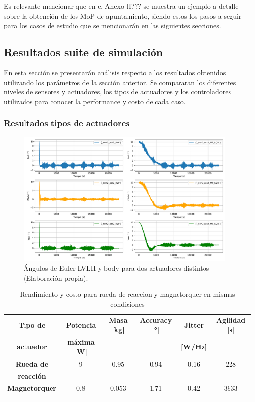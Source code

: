 Es relevante mencionar que en el Anexo H??? se muestra un ejemplo a detalle sobre la obtención de los MoP de apuntamiento, siendo estos los pasos a seguir para los casos de estudio que se mencionarán en las siguientes secciones.

\subsection{Resultados suite de simulación}

En esta sección se presentarán análisis respecto a los resultados obtenidos utilizando los parámetros de la sección anterior. Se compararan los diferentes niveles de sensores y actuadores, los tipos de actuadores y los controladores utilizados para conocer la performance y costo de cada caso.

\subsubsection{Resultados tipos de actuadores}



\begin{figure}[H]
	\centering    
	\includegraphics[width=0.97\textwidth]{MT_RW_nivel2.pdf}
	\caption{Ángulos de Euler LVLH y body para dos actuadores distintos (Elaboración propia).}
	\label{fig:MT_RW_nivel2}
\end{figure}


\begin{table}[h!]
	\centering
	\caption{Rendimiento y costo para rueda de reaccion y magnetorquer en mismas condiciones}
	\begin{tabular}{|c|c|c|c|c|c|}
		\hline
		\textbf{Tipo de}   & \textbf{Potencia} & \textbf{Masa [kg]} & \textbf{Accuracy [°]} & \textbf{Jitter} & \textbf{Agilidad [s]}  \\ 
		\textbf{actuador}   & \textbf{máxima [W]} & & & \textbf{[W/Hz]} &  \\
		\hline
		\textbf{Rueda de}   & 9  & 0.95  & 0.94 & 0.16 & 228   \\
		\textbf{reacción}   &  &   &  &  &    \\
		\hline
		\textbf{Magnetorquer}   & 0.8  & 0.053  & 1.71 & 0.42 & 3933   \\
		& & & & &   \\
		\hline
	\end{tabular}
	\label{tab:RW_MT_nivel2}
\end{table}


